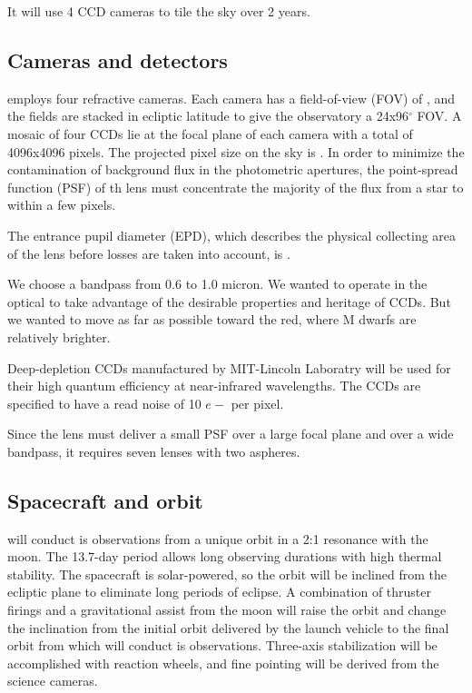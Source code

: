 \documentclass{emulateapj}
\begin{document}
It will use 4 CCD cameras to tile the sky over 2 years.

\subsection{Cameras and detectors} 

\tess employs four refractive cameras. Each camera has a field-of-view (FOV) of \fov, and the fields are stacked in ecliptic latitude to give the observatory a 24x96$^{\circ}$ FOV. A mosaic of four CCDs lie at the focal plane of each camera with a total of 4096x4096 pixels. The projected pixel size on the sky is \pixsz. In order to minimize the contamination of background flux in the photometric apertures, the point-spread function (PSF) of th lens must concentrate the majority of the flux from a star to within a few pixels. 

The entrance pupil diameter (EPD), which describes the physical collecting area of the lens before losses are taken into account, is \epd.

We choose a bandpass from 0.6 to 1.0 micron. We wanted to operate in
the optical to take advantage of the desirable properties and heritage
of CCDs. But we wanted to move as far as possible toward the red,
where M dwarfs are relatively brighter.

Deep-depletion CCDs manufactured by MIT-Lincoln Laboratry will be used for their high quantum efficiency at near-infrared wavelengths. The CCDs are specified to have a read noise of 10 $e-$ per pixel.

Since the lens must deliver a small PSF over a large focal plane and over a wide bandpass, it requires seven lenses with two aspheres.


\subsection{Spacecraft and orbit} 
\tess will conduct is observations from a unique orbit in a 2:1 resonance with the moon. The 13.7-day period allows long observing durations with high thermal stability.
The spacecraft is solar-powered, so the orbit will be inclined from the ecliptic plane to eliminate long periods of eclipse. 
A combination of thruster firings and a gravitational assist from the moon will raise the orbit and change the inclination from the initial orbit delivered by the launch vehicle to the final orbit from which \tess will conduct is observations.
Three-axis stabilization will be accomplished with reaction wheels, and fine pointing will be derived from the science cameras.
\end{document}
